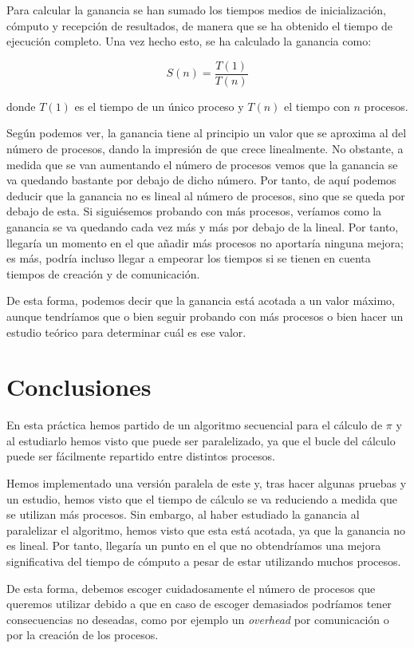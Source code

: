 \documentclass[11pt,a4paper]{article}
\begin{document}
Para calcular la ganancia se han sumado los tiempos medios de inicialización, cómputo
y recepción de resultados, de manera que se ha obtenido el tiempo de ejecución completo.
Una vez hecho esto, se ha calculado la ganancia como:

\begin{equation}
S(n) = \frac{T(1)}{T(n)}
\end{equation}

\noindent donde $T(1)$ es el tiempo de un único proceso y $T(n)$ el tiempo con $n$ procesos.

Según podemos ver, la ganancia tiene al principio un valor que se aproxima al del número de
procesos, dando la impresión de que crece linealmente. No obstante, a medida que se van aumentando
el número de procesos vemos que la ganancia se va quedando bastante por debajo de dicho número.
Por tanto, de aquí podemos deducir que la ganancia no es lineal al número de
procesos, sino que se queda por debajo de esta. Si siguiésemos probando con más procesos, veríamos
como la ganancia se va quedando cada vez más y más por debajo de la lineal. Por tanto,
llegaría un momento en el que añadir más procesos no aportaría ninguna mejora; es más, podría
incluso llegar a empeorar los tiempos si se tienen en cuenta tiempos de creación y de
comunicación.

De esta forma, podemos decir que la ganancia está acotada a un valor máximo, aunque tendríamos que
o bien seguir probando con más procesos o bien hacer un estudio teórico para determinar cuál es
ese valor.

\section{Conclusiones}

En esta práctica hemos partido de un algoritmo secuencial para el cálculo de $\pi$ y al estudiarlo
hemos visto que puede ser paralelizado, ya que el bucle del cálculo puede ser fácilmente
repartido entre distintos procesos.

Hemos implementado una versión paralela de este y, tras hacer algunas pruebas y un estudio, hemos
visto que el tiempo de cálculo se va reduciendo a medida que se utilizan más procesos. Sin
embargo, al haber estudiado la ganancia al paralelizar el algoritmo, hemos visto que esta está
acotada, ya que la ganancia no es lineal. Por tanto, llegaría un punto en el que no obtendríamos
una mejora significativa del tiempo de cómputo a pesar de estar utilizando muchos procesos.

De esta forma, debemos escoger cuidadosamente el número de procesos que queremos utilizar debido a
que en caso de escoger demasiados podríamos tener consecuencias no deseadas, como por ejemplo un
\textit{overhead} por comunicación o por la creación de los procesos.
\end{document}
